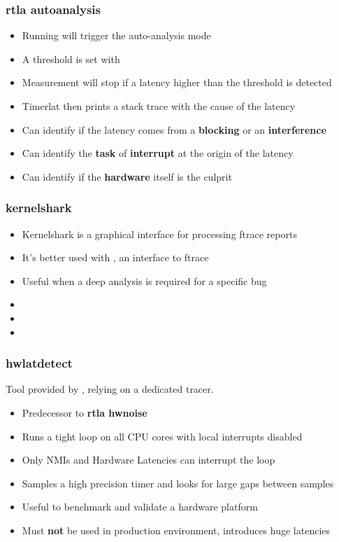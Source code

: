 \begin{frame}
	\frametitle{rtla autoanalysis}
	\begin{itemize}
		\item Running  will trigger the auto-analysis mode
		\item A threshold is set with 
		\item Measurement will stop if a latency higher than the threshold is detected
		\item Timerlat then prints a stack trace with the cause of the latency
		\item Can identify if the latency comes from a \textbf{blocking} or an \textbf{interference}
		\item Can identify the \textbf{task} of \textbf{interrupt} at the origin of the latency
		\item Can identify if the \textbf{hardware} itself is the culprit
	\end{itemize}
\end{frame}

\begin{frame}
	\frametitle{kernelshark}
	\begin{itemize}
		\item Kernelshark is a graphical interface for processing ftrace reports
		\item It's better used with , an interface to ftrace
		\item Useful when a deep analysis is required for a specific bug 
		\item {}
		\item {}
		\item {}
	\end{itemize}
\end{frame}

\begin{frame}
	\frametitle{hwlatdetect}
	Tool provided by , relying on a dedicated  tracer.
	\begin{itemize}
		\item Predecessor to \textbf{rtla hwnoise}
		\item Runs a tight loop on all CPU cores with local interrupts disabled
		\item Only NMIs and Hardware Latencies can interrupt the loop
		\item Samples a high precision timer and looks for large gaps between samples
		\item Useful to benchmark and validate a hardware platform
		\item Must \textbf{not} be used in production environment, introduces huge latencies
	\end{itemize}
\end{frame}



